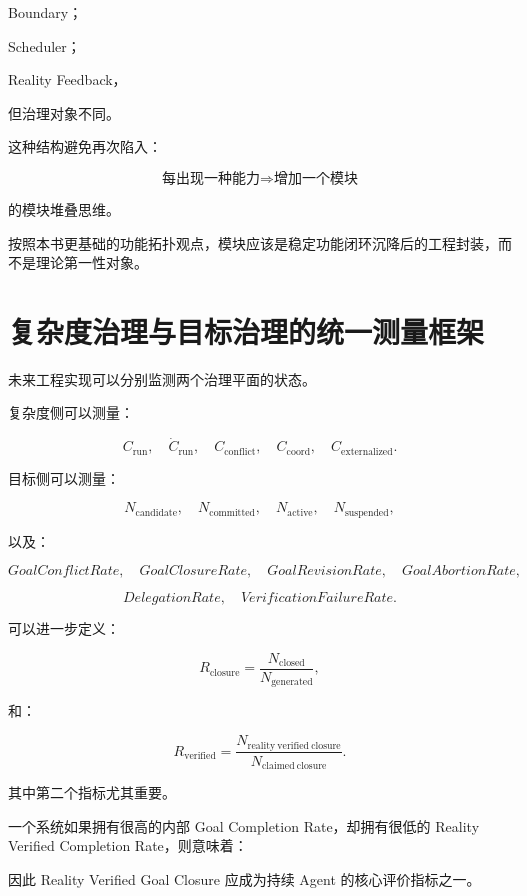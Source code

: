 Boundary；

Scheduler；

Reality Feedback，

但治理对象不同。

这种结构避免再次陷入：

\[
\text{每出现一种能力}
\Rightarrow
\text{增加一个模块}
\]

的模块堆叠思维。

按照本书更基础的功能拓扑观点，模块应该是稳定功能闭环沉降后的工程封装，而不是理论第一性对象。


\section{复杂度治理与目标治理的统一测量框架}

未来工程实现可以分别监测两个治理平面的状态。

复杂度侧可以测量：

\[
C_{\mathrm{run}},
\quad
\dot C_{\mathrm{run}},
\quad
C_{\mathrm{conflict}},
\quad
C_{\mathrm{coord}},
\quad
C_{\mathrm{externalized}}.
\]

目标侧可以测量：

\[
N_{\mathrm{candidate}},
\quad
N_{\mathrm{committed}},
\quad
N_{\mathrm{active}},
\quad
N_{\mathrm{suspended}},
\]

以及：

\[
GoalConflictRate,
\quad
GoalClosureRate,
\quad
GoalRevisionRate,
\quad
GoalAbortionRate,
\]

\[
DelegationRate,
\quad
VerificationFailureRate.
\]

可以进一步定义：

\[
R_{\mathrm{closure}}
=
\frac{
N_{\mathrm{closed}}
}{
N_{\mathrm{generated}}
},
\]

和：

\[
R_{\mathrm{verified}}
=
\frac{
N_{\mathrm{reality\ verified\ closure}}
}{
N_{\mathrm{claimed\ closure}}
}.
\]

其中第二个指标尤其重要。

一个系统如果拥有很高的内部 Goal Completion Rate，却拥有很低的 Reality Verified Completion Rate，则意味着：

\begin{statementbox}
\centering
{}
\end{statementbox}

因此 Reality Verified Goal Closure 应成为持续 Agent 的核心评价指标之一。


